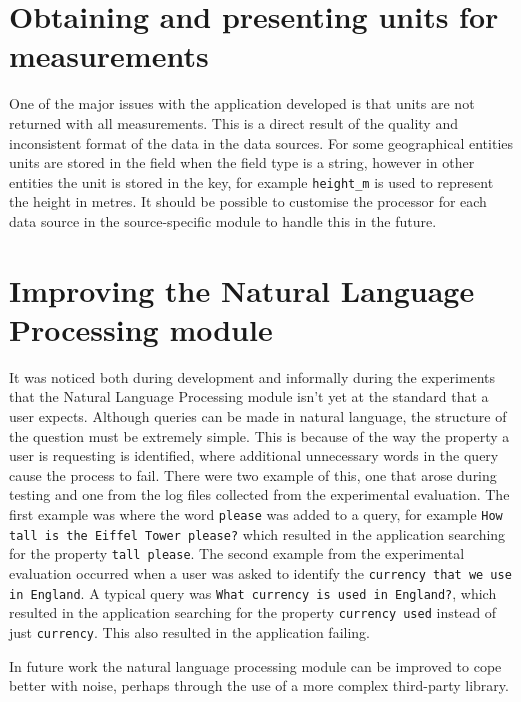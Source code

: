 \documentclass[authoryearcitations]{UoYCSproject}
\begin{document}
\section{Obtaining and presenting units for measurements}
\label{sec:evalUnits}
One of the major issues with the application developed is that units are not returned with all measurements. This is a direct result of the quality and inconsistent format of the data in the data sources. For some geographical entities units are stored in the field when the field type is a string, however in other entities the unit is stored in the key, for example \texttt{height\_m} is used to represent the height in metres. It should be possible to customise the processor for each data source in the source-specific module to handle this in the future.

\section{Improving the Natural Language Processing module}
\label{sec:evalNlp}
It was noticed both during development and informally during the experiments that the Natural Language Processing module isn't yet at the standard that a user expects. Although queries can be made in natural language, the structure of the question must be extremely simple. This is because of the way the property a user is requesting is identified, where additional unnecessary words in the query cause the process to fail. There were two example of this, one that arose during testing and one from the log files collected from the experimental evaluation. The first example was where the word \texttt{please} was added to a query, for example \texttt{How tall is the Eiffel Tower please?} which resulted in the application searching for the property \texttt{tall please}. The second example from the experimental evaluation occurred when a user was asked to identify the \texttt{currency that we use in England}. A typical query was \texttt{What currency is used in England?}, which resulted in the application searching for the property \texttt{currency used} instead of just \texttt{currency}. This also resulted in the application failing.

In future work the natural language processing module can be improved to cope better with noise, perhaps through the use of a more complex third-party library.
\end{document}
